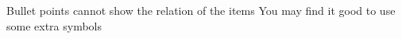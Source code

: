 \begin{itemize}
  \ngitem
  Bullet points cannot show
  the relation of the items
  \thusitem
  You may find it good to
  use some extra symbols
\end{itemize}
